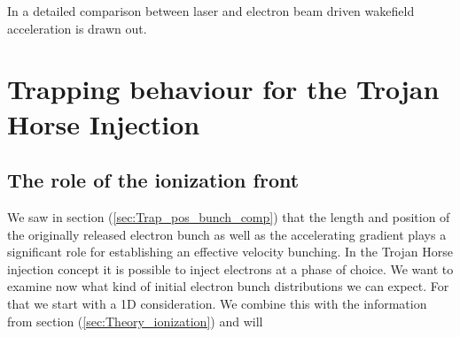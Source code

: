 In \cite{hidding2014ultrahigh} a detailed comparison between laser and electron beam driven wakefield acceleration is drawn out.
 
\section{Trapping behaviour for the Trojan Horse Injection}


\subsection{The role of the ionization front}

We saw in section (\ref{sec:Trap_pos_bunch_comp}) that the length and position of the originally released electron bunch as well as the accelerating gradient plays a significant role for establishing an effective velocity bunching. In the Trojan Horse injection concept it is possible to inject electrons at a phase of choice. We want to examine now what kind of initial electron bunch distributions we can expect. For that we start with a 1D consideration. We combine this with the information from section (\ref{sec:Theory_ionization}) and will 

